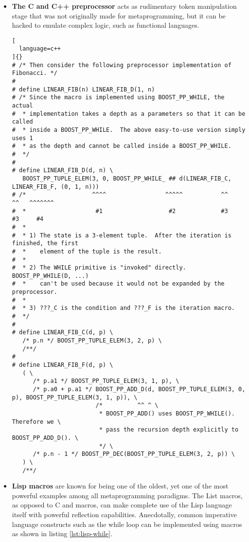 \documentclass[../main]{subfiles}
\begin{document}
\begin{itemize}

\item
\textbf{The C and C++ preprocessor} acts as rudimentary token manipulation stage
that was not originally made for metaprogramming, but it can be hacked
to emulate complex logic, such as functional languages.

\begin{lstlisting}[
  language=c++
]{}
# /* Then consider the following preprocessor implementation of Fibonacci. */
#
# define LINEAR_FIB(n) LINEAR_FIB_D(1, n)
# /* Since the macro is implemented using BOOST_PP_WHILE, the actual
#  * implementation takes a depth as a parameters so that it can be called
#  * inside a BOOST_PP_WHILE.  The above easy-to-use version simply uses 1
#  * as the depth and cannot be called inside a BOOST_PP_WHILE.
#  */
#
# define LINEAR_FIB_D(d, n) \
   BOOST_PP_TUPLE_ELEM(3, 0, BOOST_PP_WHILE_ ## d(LINEAR_FIB_C, LINEAR_FIB_F, (0, 1, n)))
# /*                   ^^^^                 ^^^^^           ^^            ^^   ^^^^^^^
#  *                    #1                   #2             #3            #3     #4
#  *
#  * 1) The state is a 3-element tuple.  After the iteration is finished, the first
#  *    element of the tuple is the result.
#  *
#  * 2) The WHILE primitive is "invoked" directly.  BOOST_PP_WHILE(D, ...)
#  *    can't be used because it would not be expanded by the preprocessor.
#  *
#  * 3) ???_C is the condition and ???_F is the iteration macro.
#  */
#
# define LINEAR_FIB_C(d, p) \
   /* p.n */ BOOST_PP_TUPLE_ELEM(3, 2, p) \
   /**/
#
# define LINEAR_FIB_F(d, p) \
   ( \
      /* p.a1 */ BOOST_PP_TUPLE_ELEM(3, 1, p), \
      /* p.a0 + p.a1 */ BOOST_PP_ADD_D(d, BOOST_PP_TUPLE_ELEM(3, 0, p), BOOST_PP_TUPLE_ELEM(3, 1, p)), \
                        /*          ^^ ^ \
                         * BOOST_PP_ADD() uses BOOST_PP_WHILE().  Therefore we \
                         * pass the recursion depth explicitly to BOOST_PP_ADD_D(). \
                         */ \
      /* p.n - 1 */ BOOST_PP_DEC(BOOST_PP_TUPLE_ELEM(3, 2, p)) \
   ) \
   /**/
\end{lstlisting}

\item
\textbf{Lisp macros}
are known for being one of the oldest, yet one of the most powerful
examples among all metaprogramming paradigms. The List macros, as opposed to
C and \cpp macros, can make complete use of the Lisp language itself
with powerful reflection capabilities.
Anecdotally, common imperative language constructs such as the while loop
can be implemented using macros as shown in listing \ref{lst:lisp-while}.


\end{itemize}
\end{document}
